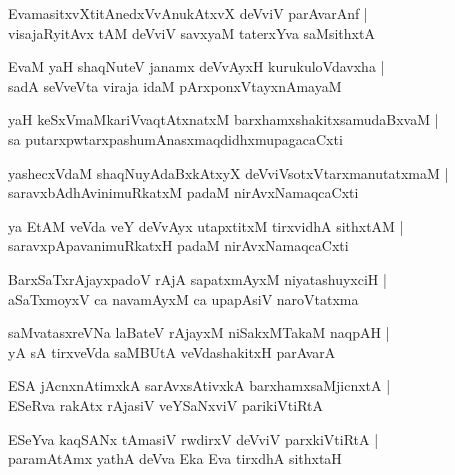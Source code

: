 \begin{shloka}
EvamasitxvXtitAnedxVvAnukAtxvX deVviV parAvarAnf |\\
visajaRyitAvx tAM deVviV savxyaM taterxYva saMsithxtA 
\end{shloka}

\begin{shloka}
EvaM yaH shaqNuteV janamx deVvAyxH kurukuloVdavxha |\\
sadA seVveVta viraja idaM pArxponxVtayxnAmayaM 
\end{shloka}

\begin{shloka}
yaH keSxVmaMkariVvaqtAtxnatxM barxhamxshakitxsamudaBxvaM |\\
sa putarxpwtarxpashumAnasxmaqdidhxmupagacaCxti
\end{shloka}

\begin{shloka}
yashecxVdaM shaqNuyAdaBxkAtxyX deVviVsotxVtarxmanutatxmaM |\\
saravxbAdhAvinimuRkatxM padaM nirAvxNamaqcaCxti
\end{shloka}

\begin{shloka}
ya EtAM veVda veY deVvAyx utapxtitxM tirxvidhA sithxtAM |\\
saravxpApavanimuRkatxH padaM nirAvxNamaqcaCxti
\end{shloka}

\begin{shloka}
BarxSaTxrAjayxpadoV rAjA sapatxmAyxM niyatashuyxciH |\\
aSaTxmoyxV ca navamAyxM ca upapAsiV naroVtatxma
\end{shloka}

\begin{shloka}
saMvatasxreVNa laBateV rAjayxM niSakxMTakaM naqpAH |\\
yA sA tirxveVda saMBUtA veVdashakitxH parAvarA
\end{shloka}

\begin{shloka}
ESA jAcnxnAtimxkA sarAvxsAtivxkA barxhamxsaMjicnxtA |\\
ESeRva rakAtx rAjasiV veYSaNxviV parikiVtiRtA
\end{shloka}

\begin{shloka}
ESeYva kaqSANx tAmasiV rwdirxV deVviV parxkiVtiRtA |\\
paramAtAmx yathA deVva Eka Eva tirxdhA sithxtaH 
\end{shloka}


